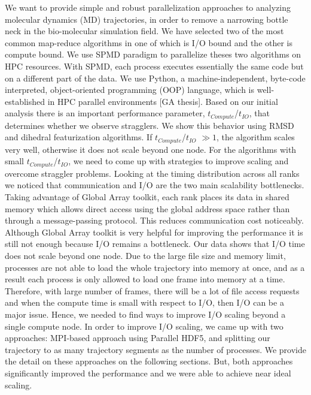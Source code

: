 We want to provide simple and robust parallelization approaches to analyzing molecular dynamics (MD) trajectories, in order to remove a narrowing bottle neck in the bio-molecular simulation field. 
We have selected two of the most common map-reduce algorithms in  one of which is I/O bound and the other is compute bound.
We use SPMD paradigm to parallelize theses two algorithms on HPC resources.
With SPMD, each process executes essentially the same code but on a different part of the data. 
We use Python, a machine-independent, byte-code interpreted, object-oriented programming (OOP) language, which is well-established in HPC parallel environments [GA thesis]. 
Based on our initial analysis there is an important performance parameter,  $t_{Compute}$/$t_{IO}$, that determines whether we observe stragglers.
We show this behavior using RMSD and dihedral featurization algorithms.
If $t_{Compute}$/$t_{IO}$  $\gg 1$, the algorithm scales very well, otherwise it does not scale beyond one node. 
For the algorithms with small $t_{Compute}$/$t_{IO}$, we need to come up with strategies to improve scaling and overcome straggler problems.
Looking at the timing distribution across all ranks we noticed that communication and I/O are the two main scalability bottlenecks.
Taking advantage of Global Array toolkit, each rank places its data in shared memory which allows direct access using the global address space rather than through a message-passing protocol. 
This reduces communication cost noticeably.
Although Global Array toolkit is very helpful for improving the performance it is still not enough because I/O remains a bottleneck.
Our data shows that I/O time does not scale beyond one node. 
Due to the large file size and memory limit, processes are not able to load the whole trajectory into memory at once, and as a result each process is only allowed to load one frame into memory at a time.
Therefore, with large number of frames, there will be a lot of file access requests and when the compute time is small with respect to I/O, then I/O can be a major issue.
Hence, we needed to find ways to improve I/O scaling beyond a single compute node.
In order to improve I/O scaling, we came up with two approaches: MPI-based approach using Parallel HDF5, and splitting our trajectory to as many trajectory segments as the number of processes. 
We provide the detail on these approaches on the following sections.
But, both approaches significantly improved the performance and we were able to achieve near ideal scaling.